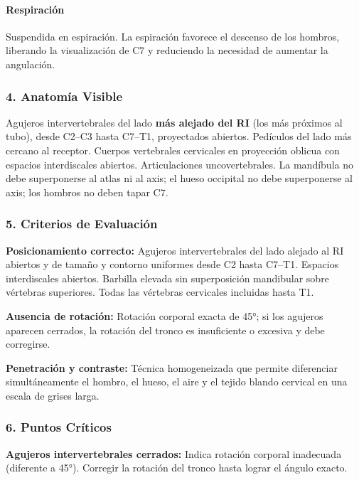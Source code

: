 		\paragraph{Respiración}
		Suspendida en espiración. La espiración favorece el descenso de los hombros, liberando la visualización de C7 y reduciendo la necesidad de aumentar la angulación.
		
		\subsubsection*{4. Anatomía Visible}
		
		Agujeros intervertebrales del lado \textbf{más alejado del RI} (los más próximos al tubo), desde C2--C3 hasta C7--T1, proyectados abiertos. Pedículos del lado más cercano al receptor. Cuerpos vertebrales cervicales en proyección oblicua con espacios interdiscales abiertos. Articulaciones uncovertebrales. La mandíbula no debe superponerse al atlas ni al axis; el hueso occipital no debe superponerse al axis; los hombros no deben tapar C7.
		
		\subsubsection*{5. Criterios de Evaluación}
		
		\textbf{Posicionamiento correcto:} Agujeros intervertebrales del lado alejado al RI abiertos y de tamaño y contorno uniformes desde C2 hasta C7--T1. Espacios interdiscales abiertos. Barbilla elevada sin superposición mandibular sobre vértebras superiores. Todas las vértebras cervicales incluidas hasta T1.
		
		\textbf{Ausencia de rotación:} Rotación corporal exacta de 45°; si los agujeros aparecen cerrados, la rotación del tronco es insuficiente o excesiva y debe corregirse.
		
		\textbf{Penetración y contraste:} Técnica homogeneizada que permite diferenciar simultáneamente el hombro, el hueso, el aire y el tejido blando cervical en una escala de grises larga.
		
		\subsubsection*{6. Puntos Críticos}
		
		\textbf{Agujeros intervertebrales cerrados:} Indica rotación corporal inadecuada (diferente a 45°). Corregir la rotación del tronco hasta lograr el ángulo exacto.
		
